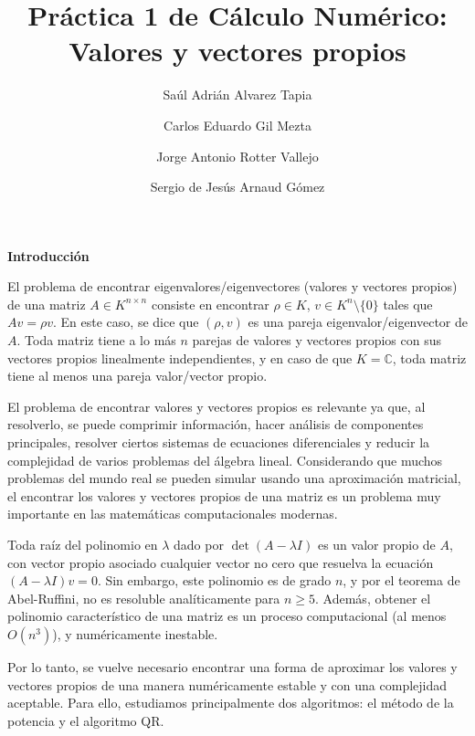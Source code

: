 \documentclass[11pt]{article}
\begin{document}
\author{Saúl Adrián Alvarez Tapia \and Carlos Eduardo Gil Mezta \and Jorge Antonio Rotter Vallejo \and Sergio de Jesús Arnaud Gómez}

\title{\Huge Práctica 1 de Cálculo Numérico: Valores y vectores propios}
\date{}
\maketitle

\noindent
\textbf{\LARGE{Introducción}}

\noindent
El problema de encontrar eigenvalores/eigenvectores (valores y vectores propios) de una matriz $A\in K^{n\times n}$ consiste en encontrar $\rho \in K$, $v\in K^n\setminus\{0\}$ tales que $Av=\rho v$. En este caso, se dice que $(\rho,v)$ es una pareja eigenvalor/eigenvector de $A$. Toda matriz tiene a lo más $n$ parejas de valores y vectores propios con sus vectores propios linealmente independientes, y en caso de que $K=\mathbb{C}$, toda matriz tiene al menos una pareja valor/vector propio.



El problema de encontrar valores y vectores propios es relevante ya que, al resolverlo, se puede comprimir información, hacer análisis de componentes principales, resolver ciertos sistemas de ecuaciones diferenciales y reducir la complejidad de varios problemas del álgebra lineal. Considerando que muchos problemas del mundo real se pueden simular usando una aproximación matricial, el encontrar los valores y vectores propios de una matriz es un problema muy importante en las matemáticas computacionales modernas.



Toda raíz del polinomio en $\lambda$ dado por $\det(A-\lambda I)$ es un valor propio de $A$, con vector propio asociado cualquier vector no cero que resuelva la ecuación $(A-\lambda I)v=0$. Sin embargo, este polinomio es de grado $n$, y por el teorema de Abel-Ruffini, no es resoluble analíticamente para $n\geq 5$. Además, obtener el polinomio característico de una matriz es un proceso computacional (al menos $O(n^3)$), y numéricamente inestable.



Por lo tanto, se vuelve necesario encontrar una forma de aproximar los valores y vectores propios de una manera numéricamente estable y con una complejidad aceptable. Para ello, estudiamos principalmente dos algoritmos: el método de la potencia y el algoritmo QR.
\end{document}
